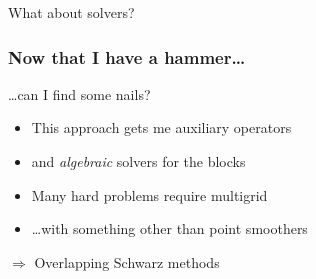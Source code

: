 \documentclass[presentation,aspectratio=43, 10pt]{beamer}
\begin{document}
\begin{frame}[standout]
  What about solvers?
\end{frame}

\begin{frame}
  \frametitle{Now that I have a hammer\ldots}
  \ldots can I find some nails?

  \begin{itemize}
  \item This approach gets me auxiliary operators
  \item and \emph{algebraic} solvers for the blocks
  \item Many hard problems require multigrid 
  \item \dots with something other than point smoothers
  \end{itemize}
  \pause

  \begin{center}
    $\Rightarrow$ Overlapping Schwarz methods
  \end{center}
\end{frame}
\end{document}
